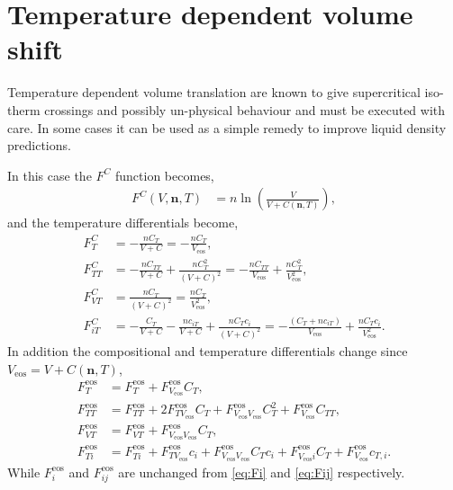 \documentclass[english]{../thermomemo/thermomemo}
\newcommand*{\vektor}[1]{\boldsymbol{#1}}%
\newcommand{\eos}{\ensuremath{\text{eos}}\xspace}
\begin{document}
\section{Temperature dependent volume shift}
Temperature dependent volume translation are known to give supercritical
iso-therm crossings \cite{Pfohl1999} and possibly un-physical
behaviour \cite{Kalikhman2010} and must be executed with care. In
some cases it can be used as a simple remedy to improve liquid density
predictions.

In this case the $F^C$ function becomes,
\begin{align}
  F^C(V,\vektor{n},T) &= n \ln \left(\frac{V}{V+C\left(\vektor{n},T\right)} \right),
  \label{eq:F_corr_t}
\end{align}
and the temperature differentials become,
\begin{align}
  F^C_{T} &= -\frac{n C_T}{V+C} = -\frac{n C_T}{V_\eos}, \\
  F^C_{TT} &= -\frac{n C_{TT}}{V+C} + \frac{n C_T^2}{\left( V+C \right)^2} = -\frac{n C_{TT}}{V_\eos} + \frac{n C_T^2}{V_\eos^2}, \\
  F^C_{VT} &= \frac{n C_T}{\left( V+C \right)^2} = \frac{n C_T}{V_\eos^2}, \\
  F^C_{iT} &= -\frac{C_T}{V+C} - \frac{n c_{iT}}{V+C} + \frac{n C_T c_i}{\left( V+C \right)^2} = -\frac{\left(C_T + n c_{iT}\right)}{V_\eos}  + \frac{n C_T c_i}{V_\eos^2}.
\end{align}
In addition the compositional and temperature differentials change
since $V_{\eos} = V + C\left(\vektor{n},T\right)$,
\begin{align}
  F^{\eos}_{T} &= F^{\eos}_{T} + F^{\eos}_{V_{\eos}} C_T , \\
  F^{\eos}_{TT} &= F^{\eos}_{TT} + 2 F^{\eos}_{TV_{\eos}} C_T + F^{\eos}_{V_{\eos}V_{\eos}} C_T^2 + F^{\eos}_{V_{\eos}} C_{TT} , \\
  F^{\eos}_{VT} &= F^{\eos}_{VT} + F^{\eos}_{V_{\eos}V_{\eos}} C_T , \\
  F^{\eos}_{Ti} &= F^{\eos}_{Ti} + F^{\eos}_{TV_{\eos}} c_i + F^{\eos}_{V_{\eos}V_{\eos}} C_T c_i + F^{\eos}_{V_{\eos}i} C_T + F^{\eos}_{V_{\eos}} c_{T,i}.
\end{align}
While $F^{\eos}_{i}$ and $F^{\eos}_{ij}$ are unchanged from
\eqref{eq:Fi} and \eqref{eq:Fij} respectively.
\clearpage


\end{document}
